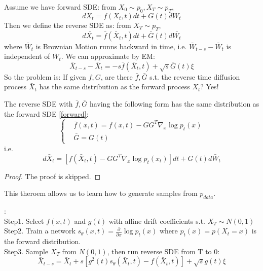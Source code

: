 Assume we have forward SDE: from $X_0\sim p_0,X_T\sim p_T$,
\begin{equation}\label{forward}
    dX_t = f(X_t, t)dt + G(t)dW_t
\end{equation}
Then we define the reverse SDE as: from $X_T\sim p_T$,
\begin{equation}
    d\bar{X_t}=\bar{f}(\bar{X}_t, t)dt + \bar{G}(t)d\bar{W_t}
\end{equation}
where $\bar{W}_t$ is Brownian Motion runns backward in time, i.e. $\bar{W}_{t-s}-\bar{W}_t$ is independent of $\bar{W}_t$. We can approximate by EM:
\begin{equation}
    \bar{X}_{t-s}-\bar{X}_t=-s\bar{f}(\bar{X}_t, t) + \sqrt{s}\bar{G}(t)\xi
\end{equation}
So the problem is: If given $f,G$, are there $\bar{f},\bar{G}$ s.t. the reverse time diffusion process $\bar{X}_t$ has the same distribution as the forward process $X_t$? Yes!
\begin{theorem}
    The reverse SDE with $\bar{f},\bar{G}$ having the following form has the same distribution as the forward SDE \ref{forward}:
    \begin{equation}\left\{
        \begin{aligned}
            &\bar{f}(x,t)=f(x,t)-GG^T\nabla_x\log p_t(x)\\
            &\bar{G}=G(t)
        \end{aligned}\right.
    \end{equation}
    i.e. 
    \begin{equation}
        d\bar{X}_t = \left[f(\bar{X}_t, t)-GG^T\nabla_x\log p_t(x_t)\right]dt+G(t)d\bar{W}_t
    \end{equation}
\end{theorem}
\begin{proof}
    The proof is skipped.
\end{proof}
This theroem allows us to learn how to generate samples from $p_{data}$.
\begin{algorithm}:\\
Step1. Select $f(x, t)$ and $g(t)$ with affine drift coefficients s.t. $X_T\sim N(0, 1)$\\
Step2. Train a network $s_\theta(x, t)=\frac{\partial}{\partial x}\log p_t(x)$ where $p_t(x)=p(X_t=x)$ is the forward distribution.\\
Step3. Sample $X_T$ from $N(0, 1)$, then run reverse SDE from T to 0:
\begin{equation}
    \bar{X}_{t-s} = \bar{X}_t + s\left[g^2(t)s_\theta(\bar{X}_t, t)-f(\bar{X}_t, t)\right] + \sqrt{s}g(t)\xi
\end{equation}
\end{algorithm}


